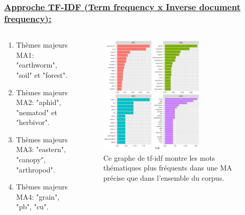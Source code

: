 \documentclass[xcolor=dvipsnames]{beamer}
\begin{document}
	\begin{frame}
		\frametitle{\underline{Approche TF-IDF (Term frequency x Inverse document frequency):}} 
		\begin{columns}
			\begin{column}{0.5\textwidth} %
				\begin{enumerate}
					\item Thèmes majeurs MA1: "earthworm", "soil" et "forest".
					\item Thèmes majeurs MA2: "aphid", "nematod" et "herbivor".
					\item Thèmes majeurs MA3: "eastern", "canopy", "arthropod".
					\item Thèmes majeurs MA4: "grain", "pb", "cu".
				\end{enumerate}
			\end{column}
			\begin{column}{0.5\textwidth}
				\begin{figure}[htb] %
					\begin{center} %
						\includegraphics[width=0.7\textwidth]{graphe_tf_idf.png}
						\caption{Ce graphe de tf-idf montre les mots thématiques plus fréquents dans une MA précise que dans l'ensemble du corpus.}\label{tf_idf}
					\end{center}
				\end{figure}
			\end{column}
		\end{columns}
	\end{frame}
\end{document}
